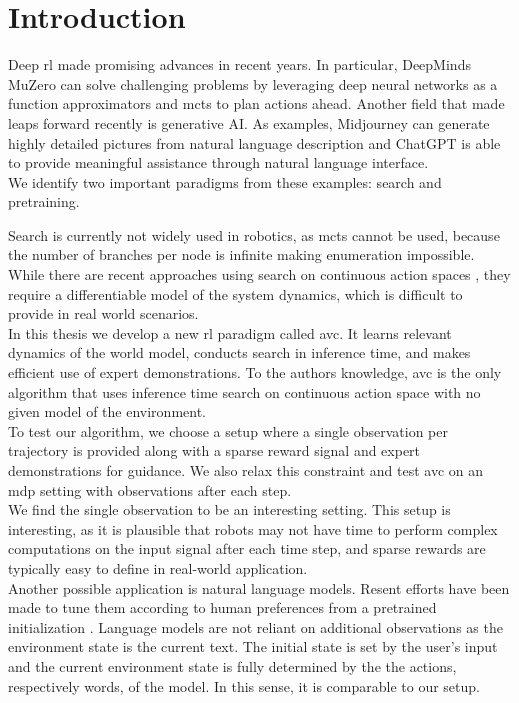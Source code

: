 \chapter{Introduction}
\label{chapter:Introduction}
Deep \ac{rl} made promising advances in recent years. In particular, DeepMinds MuZero \cite{MUZero} can solve challenging problems by leveraging deep neural networks as a function 
approximators and \ac{mcts} to plan actions ahead. 
Another field that made leaps forward recently is generative AI. As examples, Midjourney \cite{midjourney} 
can generate highly detailed pictures from natural 
language description and ChatGPT \cite{cite:ChatGPT} is able to provide meaningful assistance through natural language interface. \\

We identify two important paradigms from these examples: search and pretraining. 

Search is currently not widely used in robotics, as \ac{mcts} cannot be used, because the number of branches per node is infinite making enumeration impossible. While there are recent approaches 
using search on continuous action spaces \cite{Manna2022} \cite{Lee_Jeon_Kim_Kim_2020}, they require a differentiable model of the system dynamics, which is difficult to provide in real world scenarios.\\ 

In this thesis we develop a new \ac{rl} 
paradigm called \ac{avc}. It learns relevant dynamics of the world model, conducts search in inference time, and makes efficient use of expert demonstrations. 
To the authors knowledge, \ac{avc} is the only algorithm that uses inference time search on continuous action space with no given model of the environment.\\
To test our algorithm, we choose a setup where a single observation per trajectory is provided along with a sparse reward signal and expert demonstrations for guidance. 
We also relax this constraint and test \ac{avc} on an \ac{mdp} setting with observations after each step.\\

We find the single observation to be an interesting setting. This setup is interesting, as it is plausible that robots may not have time to perform complex computations 
on the input signal after each time step, and sparse rewards are typically easy to define in real-world application.\\

Another possible application is natural language models. Resent efforts have been made to tune 
them according to human preferences from a pretrained initialization \cite{cite:ChatGPT}. Language models are not reliant on additional observations as the environment state is the current 
text. The initial state is set by the user's input and the current environment state is fully determined by the the actions, respectively words, of the model. 
In this sense, it is comparable to our setup.\\


